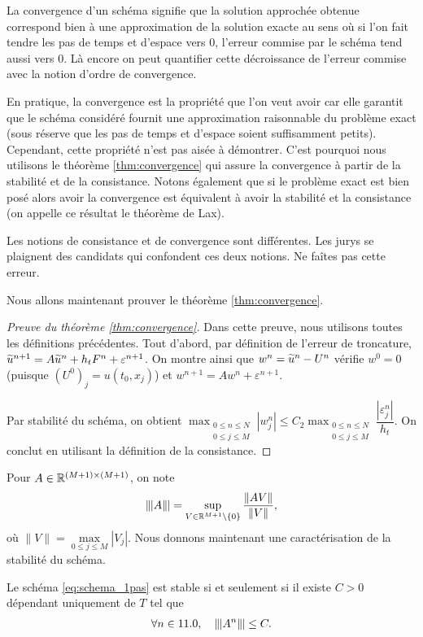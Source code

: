 \documentclass[12pt,a4paper,twoside]{article}
\begin{document}
La convergence d'un sch\'ema signifie que la solution approch\'ee obtenue
correspond bien \`a une approximation de la solution exacte
au sens o\`u si l'on fait tendre les pas de temps et d'espace vers
$0$, l'erreur commise par le sch\'ema tend aussi vers $0$.
L\`a encore on peut quantifier cette d\'ecroissance de l'erreur commise 
avec la notion d'ordre de convergence.


En pratique, la convergence est la propri\'et\'e que l'on veut avoir
car elle garantit que le sch\'ema consid\'er\'e fournit une approximation
raisonnable du probl\`eme exact (sous r\'eserve que les pas de temps
et d'espace soient suffisamment petits).
Cependant, cette propri\'et\'e n'est pas ais\'ee \`a d\'emontrer.
C'est pourquoi nous utilisons le th\'eor\`eme \ref{thm:convergence}
qui assure la convergence \`a partir de la stabilit\'e et 
de la consistance.
Notons \'egalement que si le probl\`eme exact est bien pos\'e
alors avoir la convergence est \'equivalent \`a avoir
la stabilit\'e et la consistance (on appelle ce r\'esultat le 
th\'eor\`eme de Lax). 


\begin{remark}
  Les notions de consistance et de convergence sont diff\'erentes.
  Les jurys se plaignent des candidats qui confondent ces deux
  notions.
  Ne fa\^ites pas cette erreur.
\end{remark}

Nous allons maintenant prouver le th\'eor\`eme \ref{thm:convergence}.
\begin{proof}[Preuve du th\'eor\`eme \ref{thm:convergence}]
  Dans cette preuve, nous utilisons toutes les d\'efinitions pr\'ec\'edentes.
  Tout d'abord, par d\'efinition de l'erreur de troncature,
  $\widetilde{u}^{n+1} = A \widetilde{u}^n + h_t F^n + \varepsilon^{n+1}$.
  On montre ainsi que
  $w^n = \widetilde{u}^{n} - U^{n}$ v\'erifie $w^0 = 0$ 
  (puisque $(U^0)_j = u(t_0,x_j)$) et
  $w^{n+1} = A w^n + \varepsilon^{n+1}$.

  Par stabilit\'e du sch\'ema, on obtient
  $\max_{\substack{0\leq n \leq N\\ 0 \leq j \leq M}} | w_j^n |
  \leq C_2 \max_{\substack{0\leq n \leq N\\ 0 \leq j \leq M}} \dfrac{| \varepsilon_j^n |}{h_t}$.
  On conclut en utilisant la d\'efinition de la consistance.
\end{proof}


Pour $A \in \mathbb{R}^{(M+1)\times (M+1)}$, on note 
\[
  \|\!\;\!| A \|\!\;\!| = \sup_{V \in \mathbb{R}^{M+1} \backslash\{0\}} \dfrac{\| A V \|}{\| V \|} ,
\]
o\`u $\| V \| = \max\limits_{0\leq j \leq M} | V_j |$.
Nous donnons maintenant une caract\'erisation de la stabilit\'e du sch\'ema.
\begin{proposition}
  \label{prop:carac_stab}
  Le sch\'ema \eqref{eq:schema_1pas} est stable si et seulement si
  il existe $C>0$ d\'ependant uniquement de $T$ tel que
  \begin{align}
    \label{eq:carac_stab}
    \forall n \in 11.0 , \quad \|\!\;\!| A^n \|\!\;\!| \leq C .
  \end{align}
\end{proposition}
\end{document}
